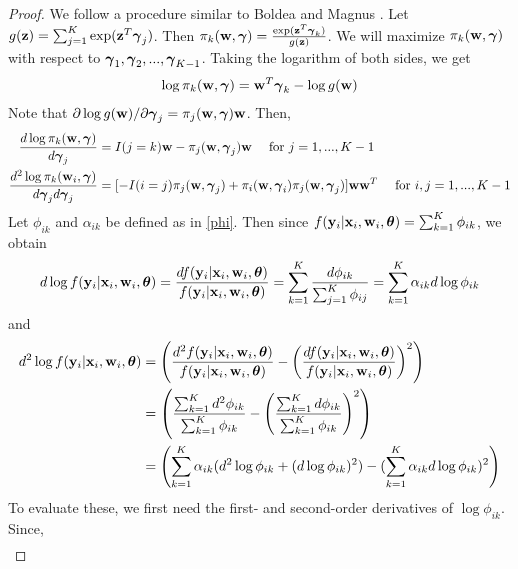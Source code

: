 \begin{proof}
We follow a procedure similar to Boldea and Magnus \cite{boldea2009}. Let $g(\mathbf  z)=\sum_{j=1}^{K}\exp(\mathbf  z^{T}\boldsymbol \gamma_{j})$. Then $\pi_{k}(\mathbf w,\boldsymbol\gamma)=\frac{\exp( \mathbf  z^{T}\boldsymbol\gamma_{k})}{g(\mathbf  z)}$. We will maximize $\pi_{k}(\mathbf w,\boldsymbol\gamma)$ with respect to $\boldsymbol\gamma_{1},\boldsymbol\gamma_{2},...,\boldsymbol\gamma_{K-1}$. Taking the logarithm of both sides, we get
\begin{align}
\log \pi_{k}(\mathbf w,\boldsymbol\gamma)=\mathbf w^{T}\boldsymbol\gamma_{k} - \log g(\mathbf w)
\label{wts}
\end{align}
Note that $\partial\log g(\mathbf w)/\partial \boldsymbol \gamma_{j}=\pi_{j}(\mathbf w,\boldsymbol\gamma) \mathbf w$. Then,
\begin{align}
\frac{d\log\pi_{k}(\mathbf w,\boldsymbol\gamma)}{d\boldsymbol\gamma_{j}}&=I(j=k)\mathbf w-\pi_{j}(\mathbf w,\boldsymbol\gamma_{j})\mathbf w\quad\text{ for }j=1,...,K-1\nonumber\\
\frac{d^{2}\log\pi_{k}(\mathbf w_{i},\boldsymbol\gamma)}{d\boldsymbol\gamma_{j}d\boldsymbol\gamma_{j}}&=[-I(i=j)\pi_{j}(\mathbf w,\boldsymbol\gamma_{j})+\pi_{i}(\mathbf w,\boldsymbol\gamma_{i})\pi_{j}(\mathbf w,\boldsymbol\gamma_{j})]\mathbf w\mathbf w^{T}\quad\text{ for }i,j=1,...,K-1
\label{logpi}
\end{align}
Let $\phi_{ik}$ and $\alpha_{ik}$ be defined as in \eqref{phi}. Then since $f(\mathbf y_{i}|\mathbf x_{i},\mathbf w_{i},\boldsymbol\theta)=\sum^{K}_{k=1}\phi_{ik}$, we obtain
\begin{align}
d\log f(\mathbf y_{i}|\mathbf x_{i},\mathbf w_{i},\boldsymbol\theta)=\frac{d f(\mathbf y_{i}|\mathbf x_{i},\mathbf w_{i},\boldsymbol\theta)}{f(\mathbf y_{i}|\mathbf x_{i},\mathbf w_{i},\boldsymbol\theta)}=\sum^{K}_{k=1}\frac{d\phi_{ik}}{\sum^{K}_{j=1}\phi_{ij}}=\sum^{K}_{k=1}\alpha_{ik}d\log \phi_{ik}\label{dlogf}
\end{align}
and 
\begin{align}\label{d2logf}
d^{2}\log f(\mathbf y_{i}|\mathbf x_{i},\mathbf w_{i},\boldsymbol\theta)&=\left(\frac{d^{2} f(\mathbf y_{i}|\mathbf x_{i},\mathbf w_{i},\boldsymbol\theta)}{f(\mathbf y_{i}|\mathbf x_{i},\mathbf w_{i},\boldsymbol\theta)}-\left(\frac{d f(\mathbf y_{i}|\mathbf x_{i},\mathbf w_{i},\boldsymbol\theta)}{f(\mathbf y_{i}|\mathbf x_{i},\mathbf w_{i},\boldsymbol\theta)}\right)^{2}\right)\nonumber\\
&=\left(\frac{\sum^{K}_{k=1}d^{2}\phi_{ik}}{\sum^{K}_{k=1}\phi_{ik}}-\left(\frac{\sum^{K}_{k=1}d \phi_{ik}}{\sum^{K}_{k=1}\phi_{ik}}\right)^{2}\right)\nonumber\\
&=\left(\sum^{K}_{k=1}\alpha_{ik}(d^{2}\log \phi_{ik}+(d\log \phi_{ik})^{2})-(\sum^{K}_{k=1}\alpha_{ik}d\log \phi_{ik})^{2}\right)
\end{align}
To evaluate these, we first need the first- and second-order derivatives of $\log \phi_{ik}$.  Since, 
\begin{align*}

\end{align*}
\end{proof}
